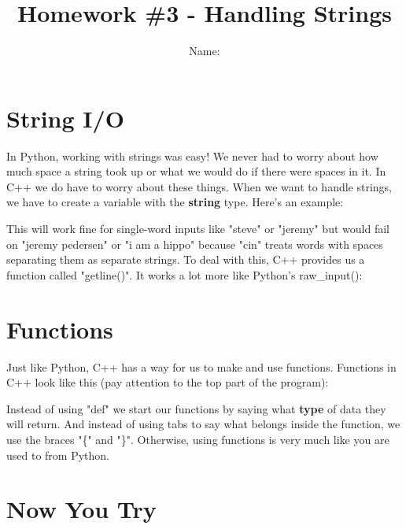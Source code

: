 \documentclass[a4paper,12pt]{article} %
\title{\textbf{Homework \#3 - Handling Strings}}
\author{Name: }
\date{} %
\begin{document}
\maketitle %

\section{String I/O}

In Python, working with strings was easy! We never had to worry about how much space a string took up or what we would do if there were spaces in it. In C++ we do have to worry about these things. When we want to handle strings, we have to create a variable with the \textbf{string} type. Here's an example:

\vspace{5mm}


\noindent
This will work fine for single-word inputs like "steve" or "jeremy" but would fail on "jeremy pedersen" or "i am a hippo" because "cin" treats words with spaces separating them as separate strings. To deal with this, C++ provides us a function called "getline()". It works a lot more like Python's raw\_input():

\vspace{5mm}


\section{Functions}

Just like Python, C++ has a way for us to make and use functions. Functions in C++ look like this (pay attention to the top part of the program):

\vspace{5mm}


\noindent Instead of using "def" we start our functions by saying what \textbf{type} of data they will return. And instead of using tabs to say what belongs inside the function, we use the braces "\{" and "\}". Otherwise, using functions is very much like you are used to from Python.\\

\section{Now You Try}
\end{document}
